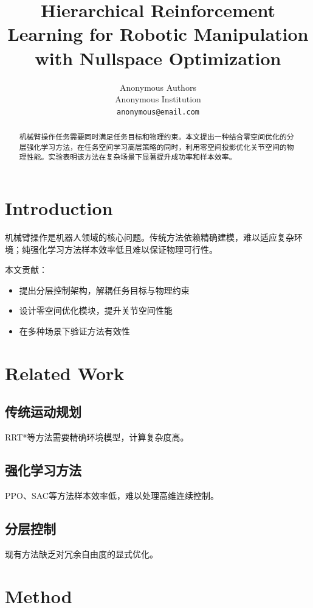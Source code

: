 \documentclass{article}
\title{Hierarchical Reinforcement Learning for Robotic Manipulation with Nullspace Optimization}
\author{Anonymous Authors \\
Anonymous Institution \\
\texttt{anonymous@email.com}}
\begin{document}
\maketitle

\begin{abstract}
机械臂操作任务需要同时满足任务目标和物理约束。本文提出一种结合零空间优化的分层强化学习方法，在任务空间学习高层策略的同时，利用零空间投影优化关节空间的物理性能。实验表明该方法在复杂场景下显著提升成功率和样本效率。
\end{abstract}

\section{Introduction}

机械臂操作是机器人领域的核心问题。传统方法依赖精确建模，难以适应复杂环境；纯强化学习方法样本效率低且难以保证物理可行性。

本文贡献：
\begin{itemize}
\item 提出分层控制架构，解耦任务目标与物理约束
\item 设计零空间优化模块，提升关节空间性能
\item 在多种场景下验证方法有效性
\end{itemize}

\section{Related Work}

\subsection{传统运动规划}
RRT*等方法需要精确环境模型，计算复杂度高。

\subsection{强化学习方法}
PPO、SAC等方法样本效率低，难以处理高维连续控制。

\subsection{分层控制}
现有方法缺乏对冗余自由度的显式优化。

\section{Method}
\end{document}
